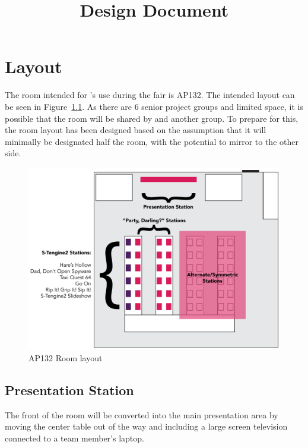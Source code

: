 \documentclass{GlobalDocument}
\begin{document}
\title{Design Document}
\author{\ourteam}



\BgUsetrue %

\chapter{Layout}
The room intended for \ourteam{}'s use during the fair is AP132. The intended layout can be seen in Figure~\ref{fig:layout}. As there are 6 senior project groups and limited space, it is possible that the room will be shared by \ourteam{} and another group. To prepare for this, the room layout has been designed based on the assumption that it will minimally be designated half the room, with the potential to mirror to the other side.

\begin{figure}[htb]
	\centering
	\includegraphics[width=\textwidth]{images/layout}
	\caption{AP132 Room layout}
	\label{fig:layout}
\end{figure}

\section{Presentation Station}
The front of the room will be converted into the main presentation area by moving the center table out of the way and including a large screen television connected to a team member's laptop.
\end{document}
